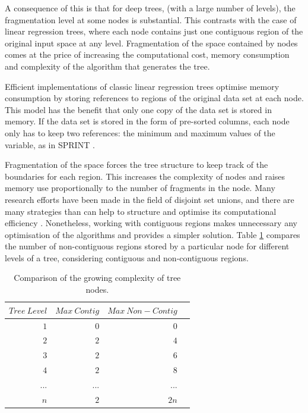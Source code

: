 \documentclass[times,twocolumn,final,authoryear]{elsarticle}
\begin{document}
A consequence of this is that for deep trees, (with a large number of levels), the fragmentation level at some nodes is substantial. This contrasts with the case of linear regression trees, where each node contains just one contiguous region of the original input space at any level. Fragmentation of the space contained by nodes comes at the price of increasing the computational cost, memory consumption and complexity of the algorithm that generates the tree.

Efficient implementations of classic linear regression trees optimise memory consumption by storing references to regions of the original data set at each node. This model has the benefit that only one copy of the data set is stored in memory. If the data set is stored in the form of pre-sorted columns, each node only has to keep two references: the minimum and maximum values of the variable, as in SPRINT \citep{Shareretal1996}.

Fragmentation of the space forces the tree structure to keep track of the boundaries for each region. This increases the complexity of nodes and raises memory use proportionally to the number of fragments in the node. Many research efforts have been made in the field of disjoint set unions, and there are many strategies than can help to structure and optimise its computational efficiency \citep{Galil1991}. Nonetheless, working with contiguous regions makes unnecessary any optimisation of the algorithms and provides a simpler solution. Table \ref{t1} compares the number of non-contiguous regions stored by a particular node for different levels of a tree, considering contiguous and non-contiguous regions.

\begin{table}[t]
\caption{Comparison of the growing complexity of tree nodes.}\label{t1}
\begin{center}
\begin{tabular}{rrrr}
\hline\hline
$Tree\ Level$ & $Max\ Contig$ & $Max\ Non-Contig$\\
\hline
$1$ & $0$ & $0$\\
$2$ & $2$ & $4$\\
$3$ & $2$ & $6$\\
$4$ & $2$ & $8$\\
... & ... & ...\\
$n$ & $2$ & $2n$\\

\hline
\end{tabular}
\end{center}
\end{table}
\end{document}
